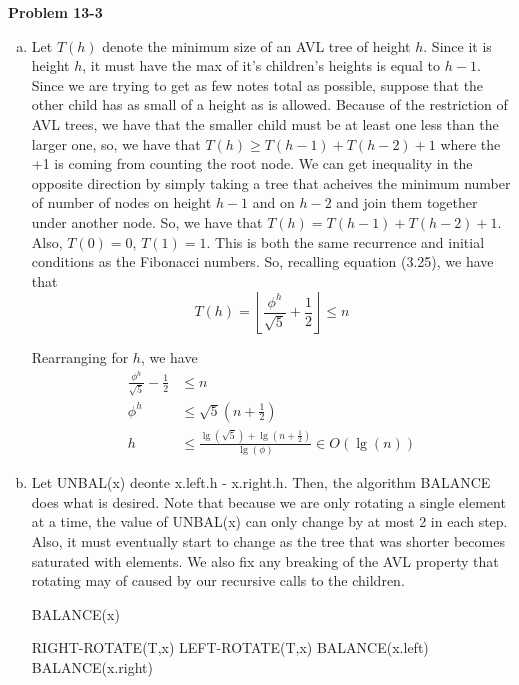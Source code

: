 \documentclass{article}
\begin{document}
\noindent\textbf{ Problem 13-3} \\
\begin{enumerate}[a.]
\item
Let $T(h)$ denote the minimum size of an AVL tree of height $h$.  Since it is height $h$, it must have the max of it's children's heights is equal to $h-1$. Since we are trying to get as few notes total as possible, suppose that the other child has as small of a height as is allowed. Because of the restriction of AVL trees, we have that the smaller child must be at least one less than the larger one, so, we have that $T(h) \ge T(h-1) + T(h-2) +1$ where the +1 is coming from counting the root node. We can get inequality in the opposite direction by simply taking a tree that acheives the minimum number of number of nodes on height $h-1$ and on $h-2$ and join them together under another node. So, we have that $T(h) = T(h-1)+T(h-2)+1$. Also, $T(0) = 0$, $T(1) = 1$. This is both the same recurrence and initial conditions as the Fibonacci numbers. So, recalling equation (3.25), we have that
\[
T(h) = \left\lfloor \frac{\phi^h}{\sqrt{5}} +\frac{1}{2} \right\rfloor \le n
\]

Rearranging for $h$, we have
\begin{align*}
\frac{\phi^h}{\sqrt{5}} -\frac{1}{2}  &\le n\\
\phi^h  &\le\sqrt{5}\left( n + \frac{1}{2} \right)\\
h &\le \frac{\lg(\sqrt{5}) + \lg(n + \frac{1}{2})}{\lg(\phi)} \in O(\lg(n))
\end{align*}

\item
Let UNBAL(x) deonte x.left.h - x.right.h. Then, the algorithm BALANCE does what is desired. Note that because we are only rotating a single element at a time, the value of UNBAL(x) can only change by at most 2 in each step. Also, it must eventually start to change as the tree that was shorter becomes saturated with elements. We also fix any breaking of the AVL property that rotating may of caused by our recursive calls to the children.
\begin{algorithm}
\caption{BALANCE(x)}
\begin{algorithmic}
\State RIGHT-ROTATE(T,x)
\Else
\State LEFT-ROTATE(T,x)
\EndIf
\State BALANCE(x.left)
\State BALANCE(x.right)
\EndWhile
\end{algorithmic}
\end{algorithm}



\end{enumerate}
\end{document}
